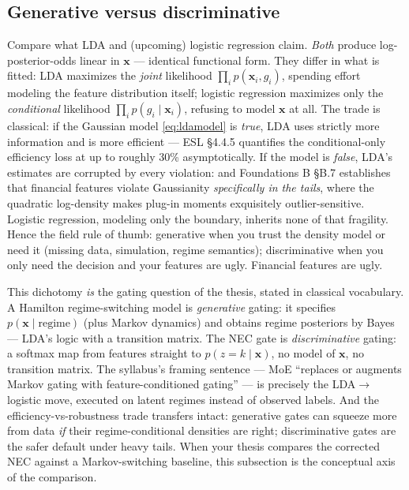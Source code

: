 \documentclass[11pt]{article}
\numberwithin{equation}{section}
\theoremstyle{plain}
\theoremstyle{definition}
\theoremstyle{remark}
\newcommand{\x}{\bm{x}}
\begin{document}
\subsection{Generative versus discriminative}\label{sec:genvdisc}

Compare what LDA and (upcoming) logistic regression claim. \emph{Both} produce log-posterior-odds linear in $\x$ --- identical functional form. They differ in what is fitted: LDA maximizes the \emph{joint} likelihood $\prod_i p(\x_i, g_i)$, spending effort modeling the feature distribution itself; logistic regression maximizes only the \emph{conditional} likelihood $\prod_i p(g_i \mid \x_i)$, refusing to model $\x$ at all. The trade is classical: if the Gaussian model \eqref{eq:ldamodel} is \emph{true}, LDA uses strictly more information and is more efficient --- ESL \S4.4.5 quantifies the conditional-only efficiency loss at up to roughly 30\% asymptotically. If the model is \emph{false}, LDA's estimates are corrupted by every violation: and Foundations B \S B.7 establishes that financial features violate Gaussianity \emph{specifically in the tails}, where the quadratic log-density makes plug-in moments exquisitely outlier-sensitive. Logistic regression, modeling only the boundary, inherits none of that fragility. Hence the field rule of thumb: generative when you trust the density model or need it (missing data, simulation, regime semantics); discriminative when you only need the decision and your features are ugly. Financial features are ugly.

\begin{necbox}
This dichotomy \emph{is} the gating question of the thesis, stated in classical vocabulary. A Hamilton regime-switching model is \emph{generative} gating: it specifies $p(\x \mid \text{regime})$ (plus Markov dynamics) and obtains regime posteriors by Bayes --- LDA's logic with a transition matrix. The NEC gate is \emph{discriminative} gating: a softmax map from features straight to $p(z = k \mid \x)$, no model of $\x$, no transition matrix. The syllabus's framing sentence --- MoE ``replaces or augments Markov gating with feature-conditioned gating'' --- is precisely the LDA$\to$logistic move, executed on latent regimes instead of observed labels. And the efficiency-vs-robustness trade transfers intact: generative gates can squeeze more from data \emph{if} their regime-conditional densities are right; discriminative gates are the safer default under heavy tails. When your thesis compares the corrected NEC against a Markov-switching baseline, this subsection is the conceptual axis of the comparison.
\end{necbox}
\end{document}
